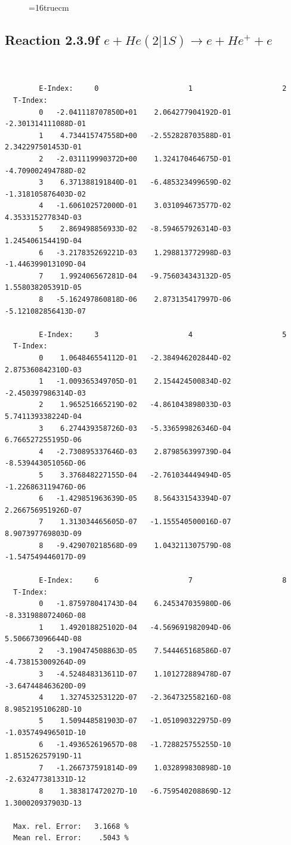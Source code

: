 \documentclass[12pt,dvips]{article}
\begin{document}
\begin{figure} \label{2.3.9e}
\epsfxsize=16truecm
\end{figure}
\newpage

\subsection{
Reaction 2.3.9f  $e + He(2|1S) \rightarrow e + He^+ + e  $
}



\begin{small}\begin{verbatim}


        E-Index:     0                     1                     2
  T-Index:
        0   -2.041118707850D+01    2.064277904192D-01   -2.301314111088D-01
        1    4.734415747558D+00   -2.552828703588D-01    2.342297501453D-01
        2   -2.031119990372D+00    1.324170464675D-01   -4.709002494788D-02
        3    6.371388191840D-01   -6.485323499659D-02   -1.318105876403D-02
        4   -1.606102572000D-01    3.031094673577D-02    4.353315277834D-03
        5    2.869498856933D-02   -8.594657926314D-03    1.245406154419D-04
        6   -3.217835269221D-03    1.298813772998D-03   -1.446399013109D-04
        7    1.992406567281D-04   -9.756034343132D-05    1.558038205391D-05
        8   -5.162497860818D-06    2.873135417997D-06   -5.121082856413D-07

        E-Index:     3                     4                     5
  T-Index:
        0    1.064846554112D-01   -2.384946202844D-02    2.875360842310D-03
        1   -1.009365349705D-01    2.154424500834D-02   -2.450397986314D-03
        2    1.965251665219D-02   -4.861043898033D-03    5.741139338224D-04
        3    6.274439358726D-03   -5.336599826346D-04    6.766527255195D-06
        4   -2.730895337646D-03    2.879856399739D-04   -8.539443051056D-06
        5    3.376848227155D-04   -2.761034449494D-05   -1.226863119476D-06
        6   -1.429851963639D-05    8.564331543394D-07    2.266756951926D-07
        7    1.313034465605D-07   -1.155540500016D-07    8.907397769803D-09
        8   -9.429070218568D-09    1.043211307579D-08   -1.547549446017D-09

        E-Index:     6                     7                     8
  T-Index:
        0   -1.875978041743D-04    6.245347035980D-06   -8.331988072406D-08
        1    1.492018825102D-04   -4.569691982094D-06    5.506673096644D-08
        2   -3.190474508863D-05    7.544465168586D-07   -4.738153009264D-09
        3   -4.524848313611D-07    1.101272889478D-07   -3.647448463620D-09
        4    1.327453253122D-07   -2.364732558216D-08    8.985219510628D-10
        5    1.509448581903D-07   -1.051090322975D-09   -1.035749496501D-10
        6   -1.493652619657D-08   -1.728825755255D-10    1.851526257919D-11
        7   -1.266737591814D-09    1.032899830898D-10   -2.632477381331D-12
        8    1.383817472027D-10   -6.759540208869D-12    1.300020937903D-13

  Max. rel. Error:   3.1668 %
  Mean rel. Error:    .5043 %


\end{verbatim}\end{small}
\end{document}

